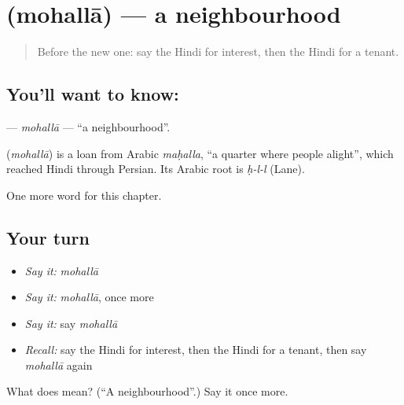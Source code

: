 \section[\texorpdfstring{\hi{मोहल्ला} (mohallā)}{मोहल्ला (mohallā)}]{ (mohallā) — a neighbourhood}

\label{lesson:HI-C271-mohalla}



\begin{quote}
Before the new one: say the Hindi for interest, then the Hindi for a tenant.
\end{quote}

\subsection*{You'll want to know: }
\textbf{} — \emph{mohallā} — \textquotedblleft{}a neighbourhood\textquotedblright{}.

\begin{cousinweb}
\textbf{} (\emph{mohallā}) is a loan from Arabic \emph{maḥalla}, \textquotedblleft{}a quarter where people alight\textquotedblright{}, which reached Hindi through Persian. Its Arabic root is \emph{ḥ-l-l} (Lane).
\end{cousinweb}

\begin{grammarlens}[title={What you've built}]
One more word for this chapter.
\end{grammarlens}

\subsection*{Your turn}
\begin{itemize}
\raggedright
  \item \emph{Say it:} \emph{mohallā}
  \item \emph{Say it:} \emph{mohallā}, once more
  \item \emph{Say it:} say \emph{mohallā}
  \item \emph{Recall:} say the Hindi for interest, then the Hindi for a tenant, then say \emph{mohallā} again
\end{itemize}

\begin{tcolorbox}[breakable,colback=teal!4,colframe=teal!35!black,title={Before you move on}]
What does  mean? (\textquotedblleft{}A neighbourhood\textquotedblright{}.) Say it once more.
\end{tcolorbox}
